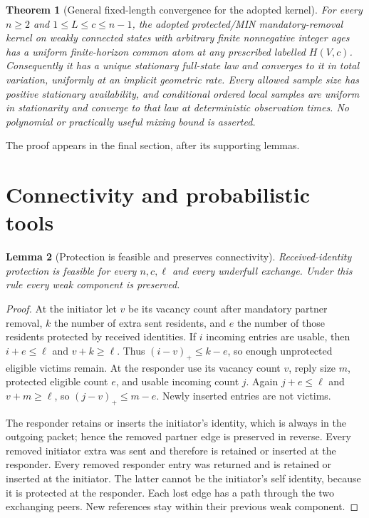 \documentclass[11pt]{article}
\newtheorem{theorem}{Theorem}
\newtheorem{lemma}[theorem]{Lemma}
\begin{document}
\begin{theorem}[General fixed-length convergence for the adopted kernel]
\label{thm:allparametersuniform}
For every $n\ge2$ and $1\le L\le c\le n-1$, the adopted
protected/MIN mandatory-removal kernel on weakly connected states
with arbitrary finite nonnegative integer ages has a uniform
finite-horizon common atom at any prescribed labelled $H(V,c)$.
Consequently it has a unique stationary full-state law and converges
to it in total variation, uniformly at an implicit geometric rate.
Every allowed sample size has positive stationary availability, and
conditional ordered local samples are uniform in stationarity and
converge to that law at deterministic observation times.
No polynomial or practically useful mixing bound is asserted.
\end{theorem}

The proof appears in the final section, after its supporting lemmas.

\section{Connectivity and probabilistic tools}

\begin{lemma}[Protection is feasible and preserves connectivity]
\label{lem:receiveprotect}
Received-identity protection is feasible for every $n,c,\ell$
and every underfull exchange. Under this rule every weak
component is preserved.
\end{lemma}
\begin{proof}
At the initiator let $v$ be its vacancy count after mandatory
partner removal, $k$ the number of extra sent residents, and
$e$ the number of those residents protected by received
identities. If $i$ incoming entries are usable, then
$i+e\le\ell$ and $v+k\ge\ell$.
Thus $(i-v)_+\le k-e$, so enough unprotected eligible
victims remain. At the responder use its vacancy count $v$,
reply size $m$, protected eligible count $e$, and usable
incoming count $j$. Again $j+e\le\ell$ and $v+m\ge\ell$,
so $(j-v)_+\le m-e$. Newly inserted entries are not victims.

The responder retains or inserts the initiator's identity,
which is always in the outgoing packet; hence the removed
partner edge is preserved in reverse.
Every removed initiator extra was sent and therefore is
retained or inserted at the responder.
Every removed responder entry was returned and is retained
or inserted at the initiator. The latter cannot be the
initiator's self identity, because it is protected at the
responder. Each lost edge has a path through the two
exchanging peers. New references stay within their previous
weak component.
\end{proof}
\end{document}
